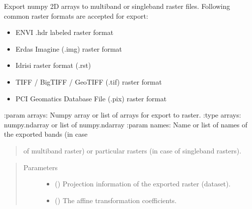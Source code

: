 \documentclass[letterpaper,10pt,english]{sphinxmanual}
\begin{document}
\begin{fulllineitems}
\label{\detokenize{libs:hydrIO.arrayToRast}}
Export numpy 2D arrays to multiband or singleband raster files. Following
common raster formats are accepted for export:
\begin{itemize}
\item {} 
ENVI .hdr labeled raster format

\item {} 
Erdas Imagine (.img) raster format

\item {} 
Idrisi raster format (.rst)

\item {} 
TIFF / BigTIFF / GeoTIFF (.tif) raster format

\item {} 
PCI Geomatics Database File (.pix) raster format

\end{itemize}

:param arrays: Numpy array or list of arrays for export to raster.
:type arrays: numpy.ndarray or list of numpy.ndarray
:param names: Name or list of names of the exported bands (in case
\begin{quote}

of multiband raster) or particular rasters (in case of singleband
rasters).
\end{quote}
\begin{quote}\begin{description}
\item[{Parameters}] \leavevmode\begin{itemize}
\item {} 
 () \textendash{} Projection information of the exported raster (dataset).

\item {} 
 () \textendash{} The affine transformation coefficients.


\end{itemize}
\end{description}
\end{quote}
\end{fulllineitems}
\end{document}

